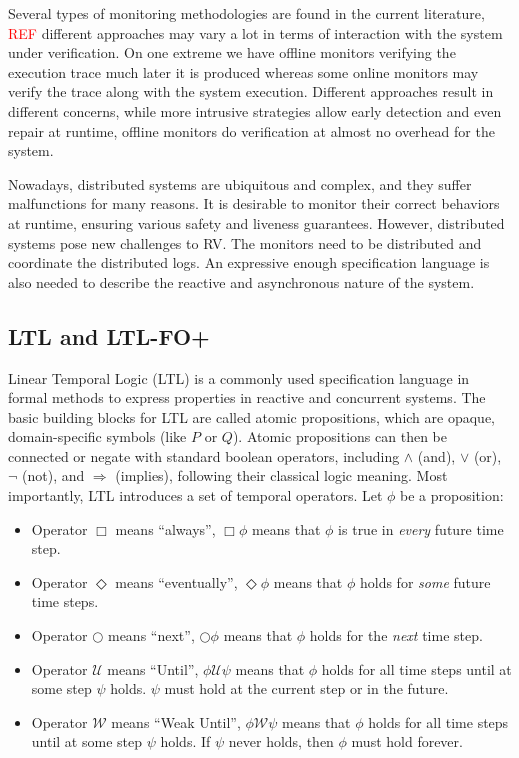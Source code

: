 \documentclass[format=acmsmall, nonacm=true, review=true, screen=true]{acmart}
\newcommand{\red}[1]{\textcolor{red}{#1}}
\begin{document}
Several types of monitoring methodologies are found in the current literature, \red{REF} different approaches may vary a lot in terms of interaction with the system under verification. On one extreme we have offline monitors verifying the execution trace much later it is produced whereas some online monitors may verify the trace along with the system execution. Different approaches result in different concerns, while more intrusive strategies allow early detection and even repair at runtime, offline monitors do verification at almost no overhead for the system.

Nowadays, distributed systems are ubiquitous and complex, and they suffer malfunctions for many reasons. It is desirable to monitor their correct behaviors at runtime, ensuring various safety and liveness guarantees. However, distributed systems pose new challenges to RV. The monitors need to be distributed and coordinate the distributed logs. An expressive enough specification language is also needed to describe the reactive and asynchronous nature of the system.

\subsection{LTL and LTL-FO+}
Linear Temporal Logic (LTL) is a commonly used specification language in formal methods to express properties in reactive and concurrent systems. The basic building blocks for LTL are called atomic propositions, which are opaque, domain-specific symbols (like $P$ or $Q$). Atomic propositions can then be connected or negate with standard boolean operators, including $\land$ (and), $\lor$ (or), $\lnot$ (not), and $\Rightarrow$ (implies), following their classical logic meaning. Most importantly, LTL introduces a set of temporal operators. Let $\phi$ be a proposition:
\begin{itemize}
  \item Operator $\Box$ means  ``always'', $\Box \phi$ means that $\phi$ is true in \textit{every} future time step.
  \item Operator $\Diamond$ means ``eventually'', $\Diamond \phi$ means that $\phi$ holds for \textit{some} future time steps.
  \item Operator $\bigcirc$ means ``next'', $\bigcirc \phi$ means that $\phi$ holds for the \textit{next} time step.
  \item Operator $\mathcal{U}$ means ``Until'', $\phi \mathcal{U}\psi$ means that $\phi$ holds for all time steps until at some step $\psi$ holds. $\psi$ must hold at the current step or in the future.
  \item Operator $\mathcal{W}$ means ``Weak Until'', $\phi \mathcal{W}\psi$ means that $\phi$ holds for all time steps until at some step $\psi$ holds. If $\psi$ never holds, then $\phi$ must hold forever.
\end{itemize}
\end{document}
